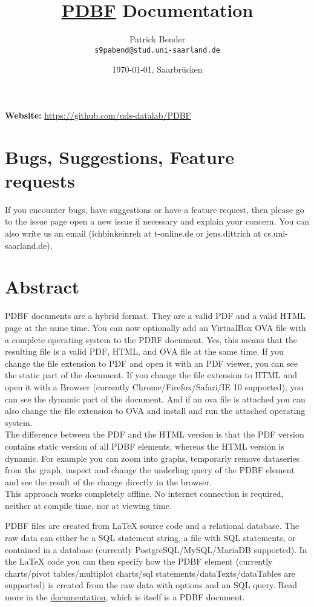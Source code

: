 \documentclass[11pt]{article}
\title{\href{https://github.com/uds-datalab/PDBF}{PDBF} Documentation}
\author{
 Patrick Bender\\
  \texttt{s9pabend@stud.uni-saarland.de}
}
\date{\today{}, Saarbrücken}
\begin{document}
\maketitle
\noindent \textbf{Website:} \url{https://github.com/uds-datalab/PDBF}\\
\noindent \textbf{}

\tableofcontents
\newpage

\section{Bugs, Suggestions, Feature requests}
If you encounter bugs, have suggestions or have a feature request, then please go to the issue page open a new issue if necessary and explain your concern. You can also write us an email (ichbinkeinreh at t-online.de or jens.dittrich at cs.uni-saarland.de).

\section{Abstract}
PDBF documents are a hybrid format. They are a valid PDF and a valid HTML page at the same time. You can now optionally add an VirtualBox OVA file with a complete operating system to the PDBF document. Yes, this means that the resulting file is a valid PDF, HTML, and OVA file at the same time. If you change the file extension to PDF and open it with an PDF viewer, you can see the static part of the document. If you change the file extension to HTML and open it with a Browser (currently Chrome/Firefox/Safari/IE 10 supported), you can see the dynamic part of the document. And if an ova file is attached you can also change the file extension to OVA and install and run the attached operating system.\\
The difference between the PDF and the HTML version is that the PDF version contains static version of all PDBF elements, whereas the HTML version is dynamic. For example you can zoom into graphs, temporarly remove dataseries from the graph, inspect and change the underling query of the PDBF element and see the result of the change directly in the browser.\\
This approach works completely offline. No internet connection is required, neither at compile time, nor at viewing time.

\noindent PDBF files are created from LaTeX source code and a relational database. The raw data can either be a SQL statement string, a file with SQL statements, or contained in a database (currently PostgreSQL/MySQL/MariaDB supported). In the LaTeX code you can then specify how the PDBF element (currently charts/pivot tables/multiplot charts/sql statements/dataTexts/dataTables are supported) is created from the raw data with options and an SQL query. Read more in the \href{http://uds-datalab.github.io/PDBF/}{documentation}, which is itself is a PDBF document.\\
\end{document}
